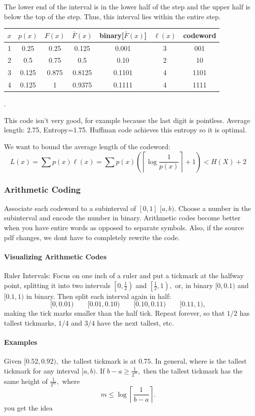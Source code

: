 \documentclass[12pt]{article}
\begin{document}
The lower end of the interval is in the lower half of the step and the upper half is below the top of the step. Thus, this interval lies within the entire step.


\begin{tabular}{c|c|c|c|c|c|c}
    $x$ & $p(x)$ & $F(x)$ & $\bar{F}(x)$ & binary[$\bar{F}(x)$] & $\ell(x)$ & codeword\\
    \hline
     1& 0.25& 0.25& 0.125& 0.001& 3& 001\\
     2& 0.5& 0.75& 0.5& 0.10& 2& 10\\
     3& 0.125& 0.875& 0.8125& 0.1101& 4& 1101\\
     4& 0.125& 1& 0.9375& 0.1111& 4& 1111
\end{tabular}.

This code isn't very good, for example because the last digit is pointless. Average length: 2.75, Entropy=1.75. Huffman code achieves this entropy so it is optimal.

We want to bound the average length of the codeword:
\[L(x)=\sum p(x)\ell(x)=\sum p(x)\left(\left\lceil\log\frac{1}{p(x)}\right\rceil+1\right)<H(X)+2\]


\subsubsection{Arithmetic Coding}
Associate each codeword to a subinterval of $[0,1]$ $[a,b).$ Choose a number in the subinterval and encode the number in binary. Arithmetic codes become better when you have entire words as opposed to separate symbols. Also, if the source pdf changes, we dont have to completely rewrite the code.

\paragraph{Visualizing Arithmetic Codes}
Ruler Intervals: Focus on one inch of a ruler and put a tickmark at the halfway point, splitting it into two intervals $\left[0,\frac{1}{2}\right)$ and $\left[\frac{1}{2},1\right),$ or, in binary $[0,0.1)$ and $[0.1,1)$ in binary. Then split each interval again in half:
\[[0,0.01)\qquad[0.01,0.10)\qquad[0.10,0.11)\qquad[0.11,1),\] making the tick marks smaller than the half tick. Repeat forever, so that $1/2$ has tallest tickmarks, $1/4$ and $3/4$ have the next tallest, etc. 
\paragraph{Examples}
Given $[0.52,0.92),$ the tallest tickmark is at $0.75.$ In general, where is the tallest tickmark for any interval $[a,b).$ If $b-a\ge\frac{1}{2^m},$ then the tallest tickmark has the same height of $\frac{1}{2^m},$ where
\[m\le\log\left\lceil\frac{1}{b-a}\right\rceil.\]
you get the idea
\end{document}
